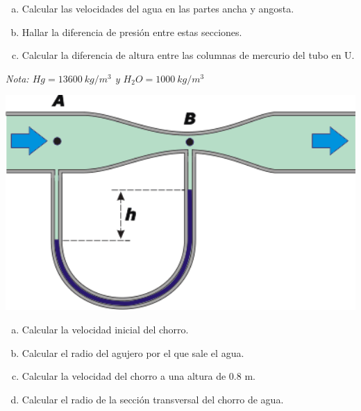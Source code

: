 \documentclass{article}
\begin{document}
\vspace{0.5cm}
\hspace{-0.7cm}
\begin{minipage}{0.65\textwidth}
\begin{enumerate}[a)]
\item Calcular las velocidades del agua en las partes ancha y angosta.
\item Hallar la diferencia de presión entre estas secciones.
\item Calcular la diferencia de altura entre las columnas de mercurio del tubo en U.
\end{enumerate}
\textit{Nota: $Hg = 13600\ kg/m^3$ y $H_2O = 1000\ kg/m^3$}
\end{minipage}
\begin{minipage}{0.35\textwidth}
\includegraphics[width=1.0\textwidth]{imagen1.png}
\end{minipage}
\bigskip


\begin{enumerate}[a)]
\item Calcular la velocidad inicial del chorro.
\item Calcular el radio del agujero por el que sale el agua.
\item Calcular la velocidad del chorro a una altura de 0.8 m.
\item Calcular el radio de la sección transversal del chorro de agua.
\end{enumerate}
\end{document}
